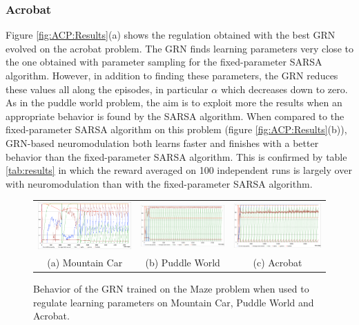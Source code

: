 \subsubsection{Acrobat}

Figure \ref{fig:ACP:Results}(a) shows the regulation obtained with the best GRN evolved on the acrobat problem. The GRN finds learning parameters very close to the one obtained with parameter sampling for the fixed-parameter SARSA algorithm. However, in addition to finding these parameters, the GRN reduces these values all along the episodes, in particular $\alpha$ which decreases down to zero. As in the puddle world problem, the aim is to exploit more the results when an appropriate behavior is found by the SARSA algorithm. When compared to the fixed-parameter SARSA algorithm on this problem (figure \ref{fig:ACP:Results}(b)), GRN-based neuromodulation both learns faster and finishes with a better behavior than the fixed-parameter SARSA algorithm. This is confirmed by table \ref{tab:results} in which the reward averaged on 100 independent runs is largely over with neuromodulation than with the fixed-parameter SARSA algorithm. 


\begin{figure}[t!]
\center
\begin{tabular}{ccc}
\includegraphics[width=0.32\linewidth]{MC_GRNMazeBehavior.pdf} &
\includegraphics[width=0.32\linewidth]{PW_GRNMazeBehavior.pdf} &
\includegraphics[width=0.32\linewidth]{ACP_GRNMazeBehavior.pdf} \\
(a) Mountain Car & (b) Puddle World & (c) Acrobat
\end{tabular}
\caption{Behavior of the GRN trained on the Maze problem when used to regulate learning parameters on Mountain Car, Puddle World and Acrobat.}\label{fig:all:GRNMazeBehavior}
\end{figure}

